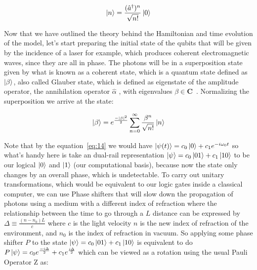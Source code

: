 \documentclass[
  journal=largetwo,
  year=2023,
]{cup-journal}
\begin{document}
\begin{equation}
  \begin{aligned}\label{eq:14.7}
    \ket{n} = \frac{(\hat{a}^{\dag})^n}{\sqrt{n!}}\ket{0}
  \end{aligned}
\end{equation}


Now that we have outlined the theory behind the Hamiltonian and time evolution of the model, let's start preparing the initial state of the qubits that will be given by the incidence of a laser for example, which produces coherent electromagnetic waves, since they are all in phase. The photons will be in a superposition state given by what is known as a coherent state, which is a quantum state defined as \(\ket{\beta}\), also called Glauber state, which is defined as eigenstate of the amplitude operator, the annihilation operator \(\hat{\alpha}\) , with eigenvalues \(\beta \in \textbf{C}\)~\autocite{bertlmann_2008_theoretical}.
Normalizing the superposition we arrive at the state:

\begin{equation}
  \begin{aligned}\label{eq:15}
    \ket{\beta} = e^{\frac{-|\beta|^2}{2}}\sum_{n=0}^{\infty}{\frac{\beta^n}{\sqrt{n!}}\ket{n}}
  \end{aligned}
\end{equation}


Note that by the equation~\ref{eq:14} we would have \(\ket{\psi(t)} = c_0\ket{0} + c_1e^{-i\omega_0t}\) so what's handy here is take an dual-rail representation \(\ket{\psi} = c_0\ket{01} + c_1\ket{10}\) to be our logical \(\ket{0}\) and \(\ket{1}\) (our computational basis), because now the state only changes by an overall phase, which is undetectable. To carry out unitary transformations, which would be equivalent to our logic gates inside a classical computer, we can use Phase shifters that will slow down the propagation of photons using a medium with a different index of refraction where the relationship between the time to go through a \(L\) distance can be expressed by \(\Delta \equiv \frac{(n - n_0)L}{c}\) where \(c\) is the light velocity \(n\) is the new index of refraction of the environment, and \(n_0\) is the index of refraction in vacuum. So applying some phase shifter \(P\) to the state \(\ket{\psi} = c_0\ket{01} + c_1\ket{10}\) is equivalent to do \(P\ket{\psi} = c_0e^{\frac{-i\Delta}{2}} + c_1e^{\frac{i\Delta}{2}}\) which can be viewed as a rotation using the usual Pauli Operator Z as:
\end{document}
